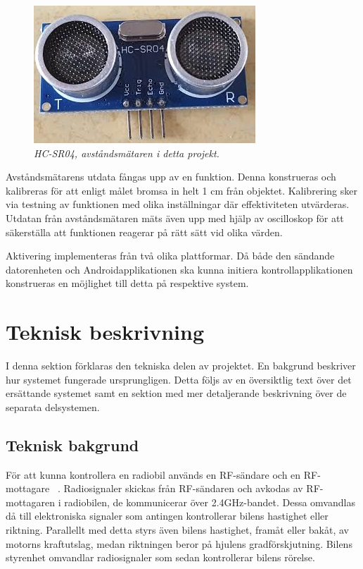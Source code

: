\documentclass[a4paper]{article}
\begin{document}
\begin{figure}[H]
\includegraphics[scale=0.6]{DistanceMeasurementFront.jpg}
\centering
\caption{\it HC-SR04, avståndsmätaren i detta projekt.}
\end{figure} 


\noindent
Avståndsmätarens utdata fångas upp av en funktion. Denna konstrueras och kalibreras för att enligt målet bromsa in helt 1 cm från objektet. Kalibrering sker via testning av funktionen med olika inställningar där effektiviteten utvärderas. Utdatan från avståndsmätaren mäts även upp med hjälp av oscilloskop för att säkerställa att funktionen reagerar på rätt sätt vid olika värden.

\vspace{5mm} \noindent
Aktivering implementeras från två olika plattformar. Då både den sändande datorenheten och Androidapplikationen ska kunna initiera kontrollapplikationen konstrueras en möjlighet till detta på respektive system. %


\newpage
\section{Teknisk beskrivning}
I denna sektion förklaras den tekniska delen av projektet. En bakgrund beskriver hur systemet fungerade ursprungligen. Detta följs av en översiktlig text över det ersättande systemet samt en sektion med mer detaljerande beskrivning över de separata delsystemen.


\subsection{Teknisk bakgrund}
För att kunna kontrollera en radiobil används en RF-sändare och en RF-mottagare ~\cite{RCTechnique}. Radiosignaler skickas från RF-sändaren och avkodas av RF-mottagaren i radiobilen, de kommunicerar över 2.4GHz-bandet. Dessa omvandlas då till elektroniska signaler som antingen kontrollerar bilens hastighet eller riktning. Parallellt med detta styrs även bilens hastighet, framåt eller bakåt, av motorns kraftutslag, medan riktningen beror på hjulens gradförskjutning. Bilens styrenhet omvandlar radiosignaler som sedan kontrollerar bilens rörelse.
\end{document}

